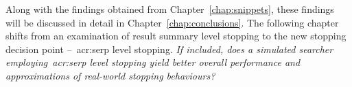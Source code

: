 Along with the findings obtained from Chapter~\ref{chap:snippets}, these findings will be discussed in detail in Chapter~\ref{chap:conclusions}. The following chapter shifts from an examination of result summary level stopping to the new stopping decision point --~\gls{acr:serp} level stopping. \emph{If included, does a simulated searcher employing~\gls{acr:serp} level stopping yield better overall performance and approximations of real-world stopping behaviours?}

\newpage
\thispagestyle{empty}
\mbox{}
\newpage
\thispagestyle{empty}
\mbox{}
\newpage